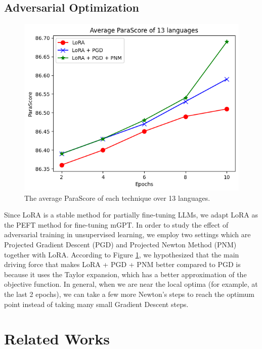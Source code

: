 \documentclass[letterpaper]{article} %
\begin{document}
\subsection{Adversarial Optimization}
\begin{figure}[h!]
    \centering
    \includegraphics[width=0.8\linewidth]{images/avg.png}
    \caption{The average ParaScore of each technique over 13 languages.}
    \label{fig:avg_records_of_adv}
\end{figure}

Since LoRA is a stable method for partially fine-tuning LLMs, we adapt LoRA as the PEFT method for fine-tuning mGPT. In order to study the effect of adversarial training in unsupervised learning, we employ two settings which are Projected Gradient Descent (PGD) and Projected Newton Method (PNM) \cite{Bertsekas1982PNM} together with LoRA. According to Figure \ref{fig:avg_records_of_adv}, we hypothesized that the main driving force that makes LoRA + PGD + PNM better compared to PGD is because it uses the Taylor expansion, which has a better approximation of the objective function. In general, when we are near the local optima (for example, at the last 2 epochs), we can take a few more Newton's steps to reach the optimum point instead of taking many small Gradient Descent steps. %

\section{Related Works}
\end{document}
